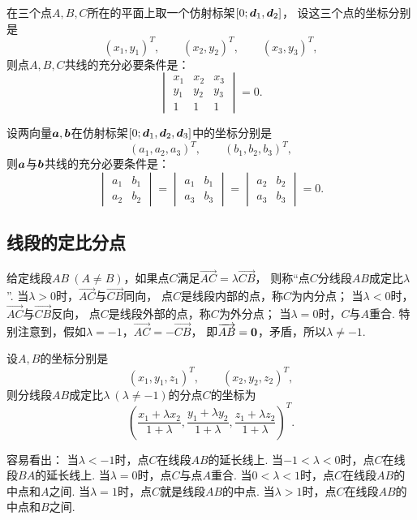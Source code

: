 \begin{theorem}\label{theorem:解析几何.平面上三点共线的充分必要条件}
在三个点\(A,B,C\)所在的平面上取一个仿射标架\([0;\boldsymbol{d}_1,\boldsymbol{d}_2]\)，
设这三个点的坐标分别是\[
	(x_1,y_1)^T, \qquad
	(x_2,y_2)^T, \qquad
	(x_3,y_3)^T,
\]
则点\(A,B,C\)共线的充分必要条件是：\[
\begin{vmatrix}
	x_1 & x_2 & x_3 \\
	y_1 & y_2 & y_3 \\
	1 & 1 & 1
\end{vmatrix} = 0.
\]
\end{theorem}

\begin{theorem}\label{theorem:解析几何.两向量共线的充分必要条件2}
设两向量\(\boldsymbol{a},\boldsymbol{b}\)在仿射标架\([0;\boldsymbol{d}_1,\boldsymbol{d}_2,\boldsymbol{d}_3]\)中的坐标分别是\[
	(a_1,a_2,a_3)^T, \qquad
	(b_1,b_2,b_3)^T,
\]
则\(\boldsymbol{a}\)与\(\boldsymbol{b}\)共线的充分必要条件是：\[
\begin{vmatrix}
	a_1 & b_1 \\
	a_2 & b_2
\end{vmatrix}
= \begin{vmatrix}
	a_1 & b_1 \\
	a_3 & b_3
\end{vmatrix}
= \begin{vmatrix}
	a_2 & b_2 \\
	a_3 & b_3
\end{vmatrix} = 0.
\]
\end{theorem}

\subsection{线段的定比分点}
给定线段\(AB\ (A \neq B)\)，如果点\(C\)满足\(\vec{AC} = \lambda \vec{CB}\)，
则称“点\(C\)分线段\(AB\)成定比\(\lambda\)”.
当\(\lambda>0\)时，\(\vec{AC}\)与\(\vec{CB}\)同向，
点\(C\)是线段内部的点，称\(C\)为内分点；
当\(\lambda<0\)时，\(\vec{AC}\)与\(\vec{CB}\)反向，
点\(C\)是线段外部的点，称\(C\)为外分点；
当\(\lambda=0\)时，\(C\)与\(A\)重合.
特别注意到，假如\(\lambda=-1\)，\(\vec{AC}=-\vec{CB}\)，
即\(\overrightarrow{AB}=\boldsymbol{0}\)，矛盾，所以\(\lambda\neq-1\).

\begin{theorem}\label{theorem:解析几何.空间两点的定比分点公式}
设\(A,B\)的坐标分别是\[
	(x_1,y_1,z_1)^T, \qquad
	(x_2,y_2,z_2)^T,
\]
则分线段\(AB\)成定比\(\lambda\ (\lambda\neq-1)\)的分点\(C\)的坐标为
\begin{equation}
	\left(
		\frac{x_1 + \lambda x_2}{1+\lambda},
		\frac{y_1 + \lambda y_2}{1+\lambda},
		\frac{z_1 + \lambda z_2}{1+\lambda}
	\right)^T.
\end{equation}
\end{theorem}
\begin{remark}
容易看出：
当\(\lambda<-1\)时，点\(C\)在线段\(AB\)的延长线上.
当\(-1<\lambda<0\)时，点\(C\)在线段\(BA\)的延长线上.
当\(\lambda=0\)时，点\(C\)与点\(A\)重合.
当\(0<\lambda<1\)时，点\(C\)在线段\(AB\)的中点和\(A\)之间.
当\(\lambda=1\)时，点\(C\)就是线段\(AB\)的中点.
当\(\lambda>1\)时，点\(C\)在线段\(AB\)的中点和\(B\)之间.
\end{remark}

